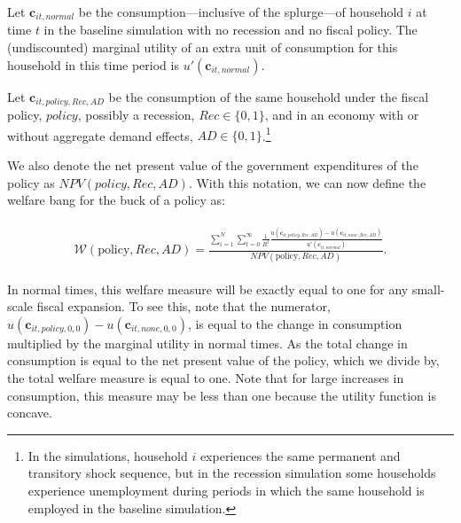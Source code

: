 \documentclass[qe]{econsocart}
\begin{document}
Let $\mathbf{c}_{it,\textit{normal}}$ be the consumption---inclusive of the splurge---of household $i$ at time $t$ in the baseline simulation with no recession and no fiscal policy.
The (undiscounted) marginal utility of an extra unit of consumption for this household in this time period is $ u'(\mathbf{c}_{it,\textit{normal}})$.

Let $\mathbf{c}_{it,\textit{policy},Rec,AD}$ be the consumption of the same household under the fiscal policy, $\textit{policy}$, possibly a recession, $Rec \in \{0,1\}$, and in an economy with or without aggregate demand effects, $AD \in \{0,1\}$.\footnote{In the simulations, household $i$ experiences the same permanent and transitory shock sequence, but in the recession simulation some households experience unemployment during periods in which the same household is employed in the baseline simulation.}

We also denote the net present value of the government expenditures of the policy as $NPV(\textit{policy},Rec,AD)$.
With this notation, we can now define the welfare bang for the buck of a policy as:

\begin{equation}
  \begin{gathered}
    \begin{aligned}
      \label{welfare6}
      \mathcal{W}(\text{policy},Rec,AD) =\frac{\sum_{i=1}^{N} \sum_{t=0}^{\infty} \frac{1}{R^t} \frac{u(\mathbf{c}_{it,\textit{policy},Rec,AD}) - u(\mathbf{c}_{it,\textit{none},Rec,AD})}{ u'(\mathbf{c}_{it,\textit{normal}})}}{NPV(\text{policy},Rec,AD)}.
    \end{aligned}
  \end{gathered}
\end{equation}

In normal times, this welfare measure will be exactly equal to one for any small-scale fiscal expansion.
To see this, note that the numerator,  $u(\mathbf{c}_{it,\textit{policy},0,0}) - u(\mathbf{c}_{it,\textit{none},0,0})$, is equal to the change in consumption multiplied by the marginal utility in normal times.
As the total change in consumption is equal to the net present value of the policy, which we divide by, the total welfare measure is equal to one.
Note that for large increases in consumption, this measure may be less than one because the utility function is concave.
\end{document}
